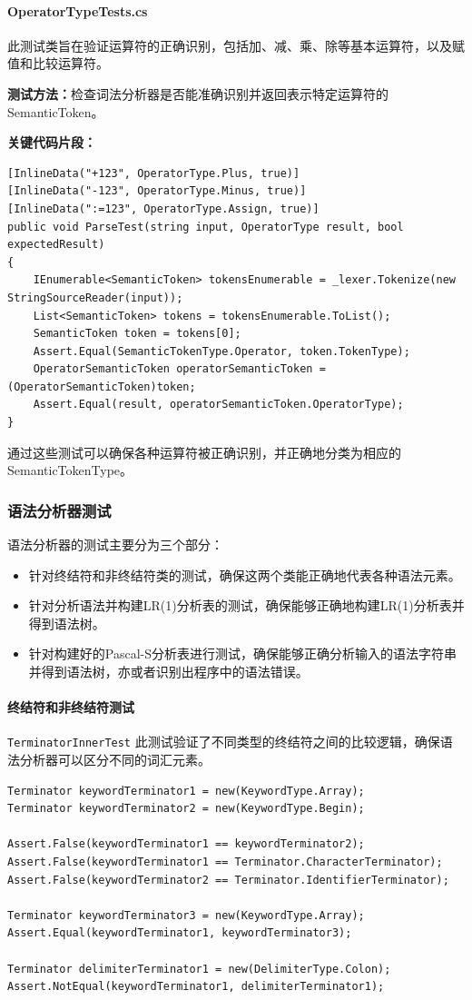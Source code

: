 \documentclass[../main.tex]{subfiles}
\begin{document}
\paragraph{OperatorTypeTests.cs}
此测试类旨在验证运算符的正确识别，包括加、减、乘、除等基本运算符，以及赋值和比较运算符。

\textbf{测试方法：}检查词法分析器是否能准确识别并返回表示特定运算符的SemanticToken。

\textbf{关键代码片段：}
\begin{lstlisting}[style=csharp]
[InlineData("+123", OperatorType.Plus, true)]
[InlineData("-123", OperatorType.Minus, true)]
[InlineData(":=123", OperatorType.Assign, true)]
public void ParseTest(string input, OperatorType result, bool expectedResult)
{
    IEnumerable<SemanticToken> tokensEnumerable = _lexer.Tokenize(new StringSourceReader(input));
    List<SemanticToken> tokens = tokensEnumerable.ToList();
    SemanticToken token = tokens[0];
    Assert.Equal(SemanticTokenType.Operator, token.TokenType);
    OperatorSemanticToken operatorSemanticToken = (OperatorSemanticToken)token;
    Assert.Equal(result, operatorSemanticToken.OperatorType);
}
\end{lstlisting}
通过这些测试可以确保各种运算符被正确识别，并正确地分类为相应的SemanticTokenType。

\subsubsection{语法分析器测试}

语法分析器的测试主要分为三个部分：
\begin{itemize}
    \item 针对终结符和非终结符类的测试，确保这两个类能正确地代表各种语法元素。
    \item 针对分析语法并构建LR(1)分析表的测试，确保能够正确地构建LR(1)分析表并得到语法树。
    \item 针对构建好的Pascal-S分析表进行测试，确保能够正确分析输入的语法字符串并得到语法树，亦或者识别出程序中的语法错误。
\end{itemize}

\paragraph{终结符和非终结符测试}
\texttt{TerminatorInnerTest} 此测试验证了不同类型的终结符之间的比较逻辑，确保语法分析器可以区分不同的词汇元素。
\begin{lstlisting}[style=csharp]
Terminator keywordTerminator1 = new(KeywordType.Array);
Terminator keywordTerminator2 = new(KeywordType.Begin);

Assert.False(keywordTerminator1 == keywordTerminator2);
Assert.False(keywordTerminator1 == Terminator.CharacterTerminator);
Assert.False(keywordTerminator2 == Terminator.IdentifierTerminator);

Terminator keywordTerminator3 = new(KeywordType.Array);
Assert.Equal(keywordTerminator1, keywordTerminator3);

Terminator delimiterTerminator1 = new(DelimiterType.Colon);
Assert.NotEqual(keywordTerminator1, delimiterTerminator1);
\end{lstlisting}
\end{document}
